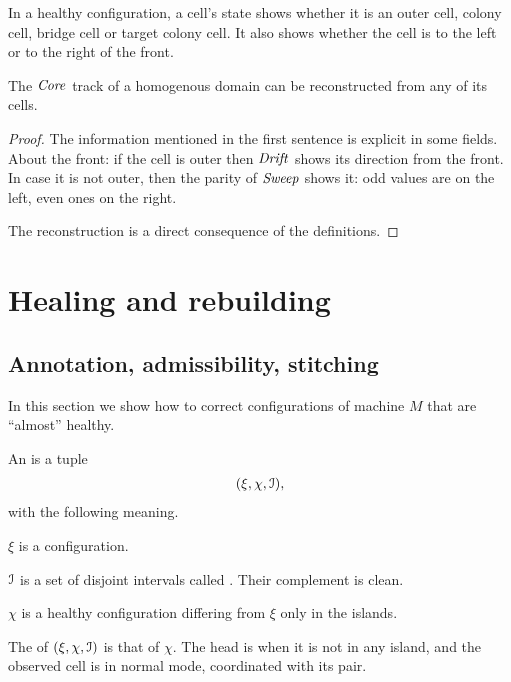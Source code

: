 \documentclass[11pt]{memoir}
\theoremstyle{definition} %
\newcommand{\fld}[1]{\ensuremath{\textit{#1\/}}}
\newcommand{\Core}{\fld{Core}}
\newcommand{\Drift}{\fld{Drift}}
\newcommand{\Sweep}{\fld{Sweep}}
\begin{document}
\begin{lemma}\label{lem:infer-between}
In a healthy configuration, 
a cell's state shows whether it is an outer cell, colony cell, bridge cell or target colony cell.
It also shows whether the cell is to the left or to the right of the front.

The \( \Core \) track of a homogenous domain can be reconstructed from any of its cells.
\end{lemma}
\begin{proof}
The information mentioned in the first sentence is explicit in some fields.
About the front: if the cell is outer then \( \Drift \) shows its direction from the front.
In case it is not outer, then the parity of \( \Sweep \) shows it: odd values are on the left, even 
ones on the right. 

The reconstruction is a direct consequence of the definitions.
\end{proof}

\section{Healing and rebuilding}\label{sec:healing}

\subsection{Annotation, admissibility, stitching}\label{sec:stitching}

In this section we show how to correct configurations of machine \( M \)
that are ``almost'' healthy.

\begin{definition}[Annotation]\label{def:annotation}
  An  is a tuple
  \begin{align*}
    (\xi,\chi, \mathcal{I}),
  \end{align*}
  with the following meaning.

  \( \xi \) is a configuration.

  \( \mathcal{I} \) is a set of disjoint intervals called .
Their complement is clean.

  \( \chi \) is a healthy configuration differing from \( \xi \) only in the islands.

The  of \( (\xi,\chi, \mathcal{I}) \) is that of \( \chi \).
The head is  when it is not in any island,
and the observed cell is in normal mode, coordinated with its pair.
  \end{definition}
\end{document}
